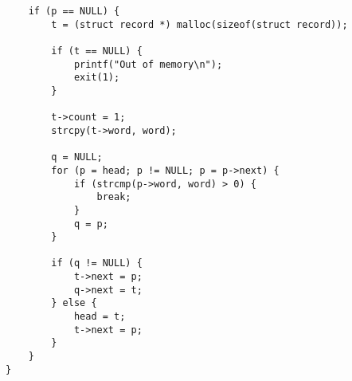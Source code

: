 \documentclass[11pt,a4paper,a4j]{jsarticle}
\begin{document}
\begin{verbatim}
    if (p == NULL) {
        t = (struct record *) malloc(sizeof(struct record));

        if (t == NULL) {
            printf("Out of memory\n");
            exit(1);
        }

        t->count = 1;
        strcpy(t->word, word);
    
        q = NULL;
        for (p = head; p != NULL; p = p->next) {
            if (strcmp(p->word, word) > 0) {
                break;
            }
            q = p;
        }

        if (q != NULL) { 
            t->next = p;            
            q->next = t;
        } else {
            head = t;
            t->next = p;
        }
    }
}
\end{verbatim}

\section{}
\end{document}
